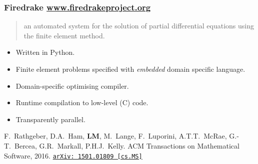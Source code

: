 \documentclass[presentation]{beamer}
\newcommand{\arxivlink}[2]{%
  \href{http://www.arxiv.org/abs/#1}%
  {\texttt{arXiv:\,#1\,[#2]}}%
}
\begin{document}
\begin{frame}
  \frametitle{Firedrake \url{www.firedrakeproject.org}}

  \begin{quote}
    {\normalfont [\ldots]} an automated system for the solution of partial
    differential equations using the finite element method.
  \end{quote}

  \begin{itemize}
  \item Written in Python.
  \item Finite element problems specified with \emph{embedded} domain
    specific language.
  \item Domain-specific optimising compiler.
  \item Runtime compilation to low-level (C) code.
  \item Transparently parallel.
  \end{itemize}

  \begin{flushright}
    {\scriptsize F.~Rathgeber, D.A.~Ham, \textbf{LM}, M.~Lange,
      F.~Luporini, A.T.T.~McRae, G.-T.~Bercea, G.R.~Markall,
      P.H.J.~Kelly. ACM Transactions on Mathematical Software,
      2016. \arxivlink{1501.01809}{cs.MS}}
  \end{flushright}
\end{frame}
\end{document}

